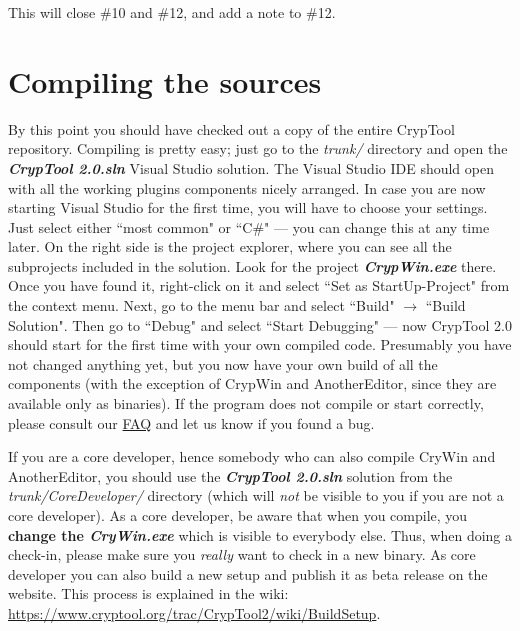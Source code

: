 \begin{center}
\end{center}


This will close \#10 and \#12, and add a note to \#12.



\section{Compiling the sources}
\label{CompilingTheSources}

By this point you should have checked out a copy of the entire CrypTool repository. Compiling is pretty easy; just go to the \textit{trunk/} directory and open the \textbf{\textit{CrypTool 2.0.sln}} Visual Studio solution. The Visual Studio IDE should open with all the working plugins components nicely arranged. In case you are now starting Visual Studio for the first time, you will have to choose your settings. Just select either ``most common" or ``C\#" --- you can change this at any time later. On the right side is the project explorer, where you can see all the subprojects included in the solution. Look for the project \textbf{\textit{CrypWin.exe}} there. Once you have found it, right-click on it and select ``Set as StartUp-Project" from the context menu. Next, go to the menu bar and select ``Build" $\rightarrow$ ``Build Solution". Then go to ``Debug" and select ``Start Debugging" --- now CrypTool 2.0 should start for the first time with your own compiled code. Presumably you have not changed anything yet, but you now have your own build of all the components (with the exception of CrypWin and AnotherEditor, since they are available only as binaries). If the program does not compile or start correctly, please consult our \href{https://www.cryptool.org/trac/CrypTool2/wiki/FAQ}{FAQ} and let us know if you found a bug.

If you are a core developer, hence somebody who can also compile CryWin and AnotherEditor, you should use the \textbf{\textit{CrypTool 2.0.sln}} solution from the \textit{trunk/CoreDeveloper/} directory (which will \textit{not} be visible to you if you are not a core developer). As a core developer, be aware that when you compile, you \textbf{change the \textit{CryWin.exe}} which is visible to everybody else. Thus, when doing a check-in, please make sure you \textit{really} want to check in a new binary. As core developer you can also build a new setup and publish it as beta release on the website. This process is explained in the wiki: \url{https://www.cryptool.org/trac/CrypTool2/wiki/BuildSetup}.